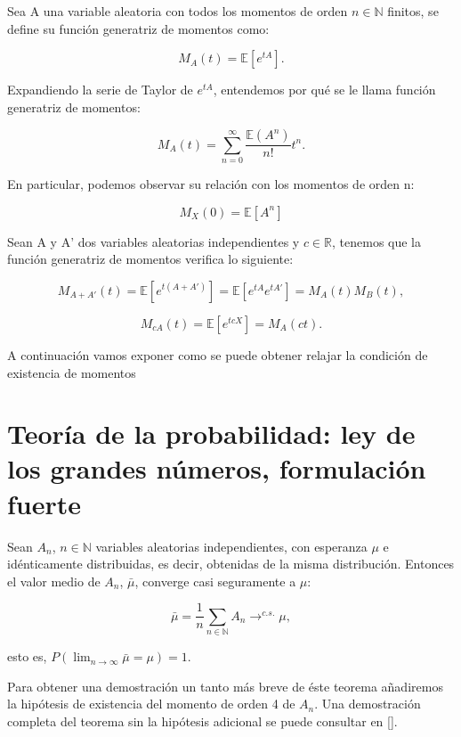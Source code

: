\documentclass[../proyecto.tex]{memoir}
\begin{document}
\begin{defi}
Sea A una variable aleatoria con todos los momentos de orden $n\in\mathds{N}$ finitos, se define su función generatriz de momentos como:

$$
M_A(t)=\mathds{E}[e^{tA}].
$$
\end{defi}
Expandiendo la serie de Taylor de $e^{tA}$, entendemos por qué se le llama función generatriz de momentos:

$$
M_A(t)=\sum_{n=0}^{\infty} \frac{\mathds{E}(A^n)}{n!}t^n.
$$

En particular, podemos observar su relación con los momentos de orden n:

$$
M_X(0)=\mathds{E}[A^n]
$$

Sean A y A' dos variables aleatorias independientes y $c \in \mathds{R}$, tenemos que la función generatriz de momentos verifica lo siguiente:

$$
M_{A+A'}(t)=\mathds{E}[e^{t(A+A')}]=\mathds{E}[e^{tA}e^{tA'}] = M_A(t)M_B(t),
$$

$$
M_{cA}(t)=\mathds{E}[e^{tcX}]=M_A(ct).
$$

A continuación vamos exponer como se puede obtener relajar la condición de existencia de momentos



\section{Teoría de la probabilidad: ley de los grandes números, formulación fuerte}
\begin{teorema}
Sean $A_n$, $n \in \mathds{N}$ variables aleatorias independientes, con esperanza $\mu$ e idénticamente distribuidas, es decir, obtenidas de la misma distribución. Entonces el valor medio de $A_n$, $\bar{\mu}$, converge casi seguramente a $\mu$:

$$
 \bar{\mu}=\frac{1}{n}\sum_{n\in\mathds{N}} A_n \to^{c.s.} \mu,
$$

esto es, $P(\lim_{n\to\infty} \bar{\mu}=\mu) = 1$.

\end{teorema}

Para obtener una demostración un tanto más breve de éste teorema añadiremos la hipótesis de existencia del momento de orden 4 de $A_n$. Una demostración completa del teorema sin la hipótesis adicional se puede consultar en [].
\end{document}
